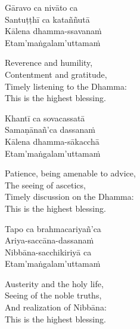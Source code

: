 \ifbfive\clearpage\fi

\begin{pali-hang-continued}
  Gāravo ca nivāto ca\\
  Santuṭṭhī ca kataññutā\\
  Kālena dhamma-ssavanaṁ\\
  Etam'maṅgalam'uttamaṁ
\end{pali-hang-continued}

\ifafive\clearpage\fi

\begin{english-verses}
  Reverence and humility,\\
  Contentment and gratitude,\\
  Timely listening to the Dhamma:\\
  This is the highest blessing.
\end{english-verses}

\ifninebythirteen\clearpage\fi

\begin{pali-hang-continued}
  Khantī ca sovacassatā\\
  Samaṇānañ'ca dassanaṁ\\
  Kālena dhamma-sākacchā\\
  Etam'maṅgalam'uttamaṁ
\end{pali-hang-continued}

\begin{english-verses}
  Patience, being amenable to advice,\\
  The seeing of ascetics,\\
  Timely discussion on the Dhamma:\\
  This is the highest blessing.
\end{english-verses}

\begin{pali-hang-continued}
  Tapo ca brahmacariyañ'ca\\
  Ariya-saccāna-dassanaṁ\\
  Nibbāna-sacchikiriyā ca\\
  Etam'maṅgalam'uttamaṁ
\end{pali-hang-continued}

\begin{english-verses}
  Austerity and the holy life,\\
  Seeing of the noble truths,\\
  And realization of Nibbāna:\\
  This is the highest blessing.
\end{english-verses}

